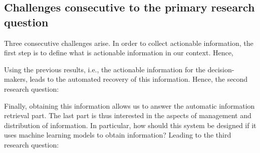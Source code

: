 \subsection{Challenges consecutive to the primary research question}
Three consecutive challenges arise.
In order to collect actionable information, the first step is to define what is actionable information in our context.
Hence,

\begin{center}
\end{center}

Using the previous results, i.e., the actionable information for the decision-makers, leads to the automated recovery of this information.
Hence, the second research question:

\begin{center}
\end{center}

Finally, obtaining this information allows us to answer the automatic information retrieval part.
The last part is thus interested in the aspects of management and distribution of information.
In particular, how should this system be designed if it uses machine learning models to obtain information?
Leading to the third research question:

\begin{center}
\end{center}

